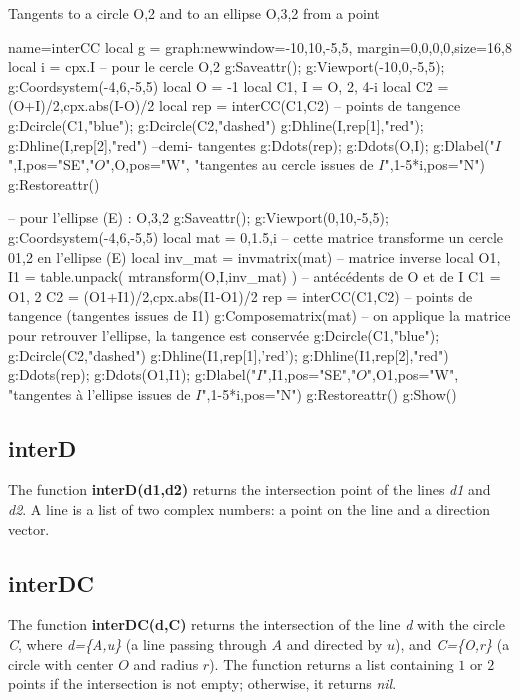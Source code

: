 \begin{demo}{Tangents to a circle {O,2} and to an ellipse {O,3,2} from a point}
\begin{luadraw}{name=interCC}
local g = graph:new{window={-10,10,-5,5}, margin={0,0,0,0},size={16,8}}
local i = cpx.I
-- pour le cercle {O,2}
g:Saveattr(); g:Viewport(-10,0,-5,5); g:Coordsystem(-4,6,-5,5)
local O = -1 
local C1, I = {O, 2}, 4-i
local C2 = {(O+I)/2,cpx.abs(I-O)/2}
local rep = interCC(C1,C2) -- points de tangence
g:Dcircle(C1,"blue"); g:Dcircle(C2,"dashed")
g:Dhline(I,rep[1],"red"); g:Dhline(I,rep[2],"red")  --demi- tangentes
g:Ddots(rep); g:Ddots({O,I}); g:Dlabel("$I$",I,{pos="SE"},"$O$",O,{pos="W"},
    "tangentes au cercle issues de $I$",1-5*i,{pos="N"})
g:Restoreattr()

-- pour l'ellipse (E) : {O,3,2}
g:Saveattr(); g:Viewport(0,10,-5,5); g:Coordsystem(-4,6,-5,5)
local mat = {0,1.5,i} -- cette matrice transforme un cercle {01,2} en l'ellipse (E)
local inv_mat = invmatrix(mat) -- matrice inverse
local O1, I1 = table.unpack( mtransform({O,I},inv_mat) ) -- antécédents de O et de I
C1 = {O1, 2}
C2 = {(O1+I1)/2,cpx.abs(I1-O1)/2}
rep = interCC(C1,C2) -- points de tangence (tangentes issues de I1)
g:Composematrix(mat) -- on applique la matrice pour retrouver l'ellipse, la tangence est conservée
g:Dcircle(C1,"blue"); g:Dcircle(C2,"dashed")
g:Dhline(I1,rep[1],'red'); g:Dhline(I1,rep[2],"red")
g:Ddots(rep); g:Ddots({O1,I1}); g:Dlabel("$I$",I1,{pos="SE"},"$O$",O1,{pos="W"},
    "tangentes à l'ellipse issues de $I$",1-5*i,{pos="N"})
g:Restoreattr()
g:Show()
\end{luadraw}
\end{demo}

\subsection{interD}
The function \textbf{interD(d1,d2)} returns the intersection point of the lines \emph{d1} and \emph{d2}. A line is a list of two complex numbers: a point on the line and a direction vector.

\subsection{interDC}
The function \textbf{interDC(d,C)} returns the intersection of the line \emph{d} with the circle \emph{C}, where \emph{d=\{A,u\}} (a line passing through $A$ and directed by $u$), and \emph{C=\{O,r\}} (a circle with center $O$ and radius $r$). The function returns a list containing $1$ or $2$ points if the intersection is not empty; otherwise, it returns \emph{nil}.

